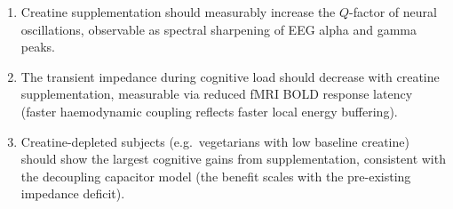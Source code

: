 \begin{enumerate}
  \item Creatine supplementation should measurably increase the
        $Q$-factor of neural oscillations, observable as spectral
        sharpening of EEG alpha and gamma peaks.
  \item The transient impedance during cognitive load should
        decrease with creatine supplementation, measurable via
        reduced fMRI BOLD response latency (faster
        haemodynamic coupling reflects faster local energy
        buffering).
  \item Creatine-depleted subjects (e.g.\ vegetarians with low
        baseline creatine) should show the largest cognitive gains
        from supplementation, consistent with the decoupling
        capacitor model (the benefit scales with the pre-existing
        impedance deficit).
\end{enumerate}
